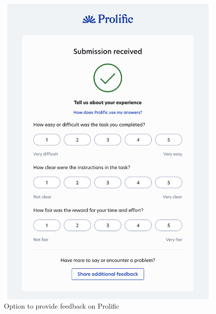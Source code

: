\begin{figure}[htbp]
    \centering
    \begin{minipage}{0.48\textwidth}
        \centering
        \includegraphics[width=\textwidth]{figures/prolific_feedback.pdf}
        \caption{Option to provide feedback on Prolific \protect\footnotemark}
        \label{fig:left}
    \end{minipage}
    \hfill
    \begin{minipage}{0.48\textwidth}
        \centering

\end{minipage}
\end{figure}

